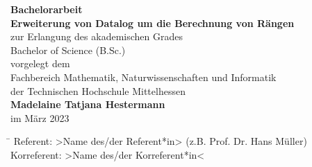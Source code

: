 \begin{titlepage}

\sffamily

\begin{center}
\vspace*{1.5cm}
{\LARGE\textbf{ Bachelorarbeit}}\\[2cm]

{\Large \textbf{Erweiterung von Datalog um die Berechnung von Rängen}}\\[3cm]

{\large zur Erlangung des akademischen Grades\\[16pt]
Bachelor of Science (B.Sc.)\\[1.5cm]
vorgelegt dem\\[1.5cm]
Fachbereich Mathematik, Naturwissenschaften und Informatik\\[16pt]
der Technischen Hochschule Mittelhessen\\[1.5cm]
{ \textbf{Madelaine Tatjana Hestermann}}\\[1.5cm]
im {März 2023}\\[1cm]
}\end{center}

\vfill

\begin{tabbing}
\hspace{2.5cm} \= \kill %
Referent:    \> {\color{red}>Name des/der Referent*in>} {\small (z.B. Prof. Dr. Hans Müller)}\\
Korreferent: \> {\color{red}>Name des/der Korreferent*in<}\\
\end{tabbing}

\vspace*{1.5cm}
\end{titlepage}
